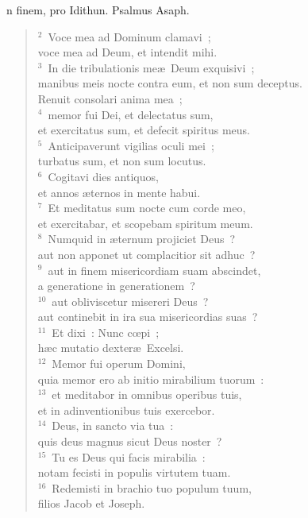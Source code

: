 \bchapter[Psalm]
n finem, pro Idithun. Psalmus Asaph.
\begin{verse}${}^{2}$~Voce mea ad Dominum clamavi~;\\ voce mea ad Deum, et intendit mihi.\\
${}^{3}$~In die tribulationis me\ae\ Deum exquisivi~;\\ manibus meis nocte contra eum, et non sum deceptus.\\ Renuit consolari anima mea~;\\
${}^{4}$~memor fui Dei, et delectatus sum,\\ et exercitatus sum, et defecit spiritus meus.\\
${}^{5}$~Anticipaverunt vigilias oculi mei~;\\ turbatus sum, et non sum locutus.\\
${}^{6}$~Cogitavi dies antiquos,\\ et annos \ae ternos in mente habui.\\
${}^{7}$~Et meditatus sum nocte cum corde meo,\\ et exercitabar, et scopebam spiritum meum.\\
${}^{8}$~Numquid in \ae ternum projiciet Deus~?\\ aut non apponet ut complacitior sit adhuc~?\\
${}^{9}$~aut in finem misericordiam suam abscindet,\\ a generatione in generationem~?\\
${}^{10}$~aut obliviscetur misereri Deus~?\\ aut continebit in ira sua misericordias suas~?\\
${}^{11}$~Et dixi~: Nunc cœpi~;\\ h\ae c mutatio dexter\ae\ Excelsi.\\
${}^{12}$~Memor fui operum Domini,\\ quia memor ero ab initio mirabilium tuorum~:\\
${}^{13}$~et meditabor in omnibus operibus tuis,\\ et in adinventionibus tuis exercebor.\\
${}^{14}$~Deus, in sancto via tua~:\\ quis deus magnus sicut Deus noster~?\\
${}^{15}$~Tu es Deus qui facis mirabilia~:\\ notam fecisti in populis virtutem tuam.\\
${}^{16}$~Redemisti in brachio tuo populum tuum,\\ filios Jacob et Joseph.\\

\end{verse}
